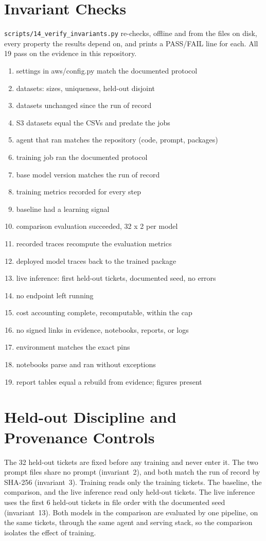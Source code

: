 \documentclass[11pt]{article}
\begin{document}
\section{Invariant Checks}
\texttt{scripts/14\_verify\_invariants.py} re-checks, offline and from the files on disk, every property the
results depend on, and prints a PASS/FAIL line for each. All 19 pass on the evidence in this repository.
\begin{enumerate}[leftmargin=*,itemsep=1pt]
\item settings in aws/config.py match the documented protocol
\item datasets: sizes, uniqueness, held-out disjoint
\item datasets unchanged since the run of record
\item S3 datasets equal the CSVs and predate the jobs
\item agent that ran matches the repository (code, prompt, packages)
\item training job ran the documented protocol
\item base model version matches the run of record
\item training metrics recorded for every step
\item baseline had a learning signal
\item comparison evaluation succeeded, 32 x 2 per model
\item recorded traces recompute the evaluation metrics
\item deployed model traces back to the trained package
\item live inference: first held-out tickets, documented seed, no errors
\item no endpoint left running
\item cost accounting complete, recomputable, within the cap
\item no signed links in evidence, notebooks, reports, or logs
\item environment matches the exact pins
\item notebooks parse and ran without exceptions
\item report tables equal a rebuild from evidence; figures present
\end{enumerate}

\section{Held-out Discipline and Provenance Controls}
The 32 held-out tickets are fixed before any training and never enter it. The two prompt files
share no prompt (invariant~2), and both match the run of record by SHA-256
(invariant~3). Training reads only the training tickets. The baseline, the comparison, and
the live inference read only held-out tickets. The live inference uses the first 6 held-out
tickets in file order with the documented seed (invariant~13). Both models in the comparison are
evaluated by one pipeline, on the same tickets, through the same agent and serving stack, so the comparison
isolates the effect of training.
\end{document}
